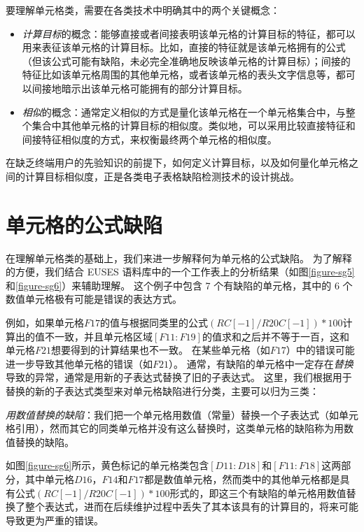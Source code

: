 要理解单元格类，需要在各类技术中明确其中的两个关键概念：
\begin{itemize}
    \item \textit{计算目标}的概念：能够直接或者间接表明该单元格的计算目标的特征，都可以用来表征该单元格的计算目标。比如，直接的特征就是该单元格拥有的公式（但该公式可能有缺陷，未必完全准确地反映该单元格的计算目标）；间接的特征比如该单元格周围的其他单元格，或者该单元格的表头文字信息等，都可以间接地暗示出该单元格可能拥有的部分计算目标。
    \item \textit{相似}的概念：通常定义相似的方式是量化该单元格在一个单元格集合中，与整个集合中其他单元格的计算目标的相似度。类似地，可以采用比较直接特征和间接特征相似度的方式，来权衡最终两个单元格的相似度。
\end{itemize}
在缺乏终端用户的先验知识的前提下，如何定义计算目标，以及如何量化单元格之间的计算目标相似度，正是各类电子表格缺陷检测技术的设计挑战。

\section{单元格的公式缺陷}

在理解单元格类的基础上，我们来进一步解释何为单元格的公式缺陷。
为了解释的方便，我们结合 EUSES 语料库中的一个工作表上的分析结果（如图\ref{figure-sg5}和\ref{figure-sg6}）来辅助理解。
这个例子中包含 7 个有缺陷的单元格，其中的 6 个数值单元格极有可能是错误的表达方式。

例如，如果单元格$F17$的值与根据同类里的公式$(RC[-1]/R20C[-1])*100$计算出的值不一致，并且单元格区域$[F11:F19]$的值求和之后并不等于一百，这和单元格$F21$想要得到的计算结果也不一致。
在某些单元格（如$F17$）中的错误可能进一步导致其他单元格的错误（如$F21$）。
通常，有缺陷的单元格中一定存在\textit{替换}导致的异常，通常是用新的子表达式替换了旧的子表达式。
这里，我们根据用于替换的新的子表达式类型来对单元格缺陷进行分类，主要可以归为三类：

\begin{definition}
   \textit{用数值替换的缺陷}：我们把一个单元格用数值（常量）替换一个子表达式（如单元格引用），然而其它的同类单元格并没有这么替换时，这类单元格的缺陷称为用数值替换的缺陷。
\end{definition}
如图\ref{figure-sg6}所示，黄色标记的单元格类包含$[D11:D18]$和$[F11:F18]$这两部分，其中单元格$D16$，$F14$和$F17$都是数值单元格，然而类中的其他单元格都是具有公式$(RC[-1]/R20C[-1])*100$形式的，即这三个有缺陷的单元格用数值替换了整个表达式，进而在后续维护过程中丢失了其本该具有的计算目的，将来可能导致更为严重的错误。

